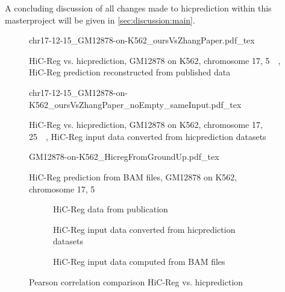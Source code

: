 A concluding discussion of all changes made to hicprediction within this masterproject
will be given in \autoref{sec:discussion:main}.
\begin{figure}[hbp]
\centering
\scriptsize
{chr17-12-15_GM12878-on-K562_oursVsZhangPaper.pdf_tex}
\caption{HiC-Reg vs. hicprediction, GM12878 on K562, chromosome 17, \SI{5}{\kilo\bp}, HiC-Reg prediction reconstructed from published 
data \cite{Zhang2019,zhangMaterial01,zhangMaterial02,zhangMaterial03}}
\label{fig:res:HicregVsHicprediction_supplementary}
\end{figure}
\begin{figure}[hbp]
\centering
\scriptsize
{chr17-12-15_GM12878-on-K562_oursVsZhangPaper_noEmpty_sameInput.pdf_tex}
\caption{HiC-Reg vs. hicprediction, GM12878 on K562, chromosome 17, \SI{25}{\kilo\bp}, HiC-Reg input data converted from hicprediction datasets}
\label{fig:res:HicregVsHicprediction_recomputed}
\end{figure}
\begin{figure}[hbp]
\centering
\scriptsize
{GM12878-on-K562_HicregFromGroundUp.pdf_tex}
\caption{HiC-Reg prediction from BAM files, GM12878 on K562, chromosome 17, \SI{5}{\kilo\bp}}
\label{fig:res:HicregVsHicprediction_fromGroundUp}
\end{figure}
\begin{figure}[hbp]
\centering
\begin{subfigure}[t]{.495\textwidth}
  \centering
 \caption{HiC-Reg data from publication \cite{Zhang2019}}
 \label{fig:res:Pearson:K562:chr17:5kb:HicregFromPublication}
\end{subfigure}\hfill%
\begin{subfigure}[t]{.495\textwidth}
  \centering
 \caption{HiC-Reg input data converted from hicprediction datasets}
 \label{fig:res:Pearson:K562:chr17:5kb:HicregFromConversion}
\end{subfigure}
\begin{subfigure}{.495\textwidth}
  \vspace{5mm}
  \centering
 \caption{HiC-Reg input data computed from BAM files}
 \label{fig:res:Pearson:K562:chr17:5kb:HicregFromBam}
\end{subfigure}
\caption{Pearson correlation comparison HiC-Reg vs. hicprediction}
\label{fig:res:Pearson:hicRegVsHicprediction}
\end{figure}